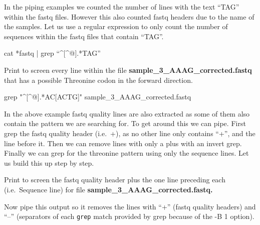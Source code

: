 \documentclass[
  letterpaper,
  DIV=11,
  numbers=noendperiod]{scrreprt}
\newenvironment{Shaded}{\begin{snugshade}}{\end{snugshade}}
\newcommand{\AttributeTok}[1]{\textcolor[rgb]{0.40,0.45,0.13}{#1}}
\newcommand{\FunctionTok}[1]{\textcolor[rgb]{0.28,0.35,0.67}{#1}}
\newcommand{\KeywordTok}[1]{\textcolor[rgb]{0.00,0.23,0.31}{#1}}
\newcommand{\NormalTok}[1]{\textcolor[rgb]{0.00,0.23,0.31}{#1}}
\newcommand{\PreprocessorTok}[1]{\textcolor[rgb]{0.68,0.00,0.00}{#1}}
\newcommand{\SpecialStringTok}[1]{\textcolor[rgb]{0.13,0.47,0.30}{#1}}
\newcommand{\StringTok}[1]{\textcolor[rgb]{0.13,0.47,0.30}{#1}}
\begin{document}
In the piping examples we counted the number of lines with the text
``TAG'' within the fastq files. However this also counted fastq headers
due to the name of the samples. Let us use a regular expression to only
count the number of sequences within the fastq files that contain
``TAG''.

\begin{Shaded}
\begin{Highlighting}[]
\FunctionTok{cat} \PreprocessorTok{*}\NormalTok{fastq }\KeywordTok{|} \FunctionTok{grep}\NormalTok{ “\^{}}\PreprocessorTok{[\^{}}\SpecialStringTok{@}\PreprocessorTok{]}\NormalTok{.}\PreprocessorTok{*}\NormalTok{TAG”}
\end{Highlighting}
\end{Shaded}

Print to screen every line within the file
\textbf{sample\_3\_AAAG\_corrected.fastq} that has a possible Threonine
codon in the forward direction.

\begin{Shaded}
\begin{Highlighting}[]
\FunctionTok{grep} \StringTok{"\^{}[\^{}@].*AC[ACTG]"}\NormalTok{ sample\_3\_AAAG\_corrected.fastq}
\end{Highlighting}
\end{Shaded}

In the above example fastq quality lines are also extracted as some of
them also contain the pattern we are searching for. To get around this
we can pipe. First grep the fastq quality header (i.e.~+), as no other
line only contains ``+'', and the line before it. Then we can remove
lines with only a plus with an invert grep. Finally we can grep for the
threonine pattern using only the sequence lines. Let us build this up
step by step.

Print to screen the fastq quality header plus the one line preceding
each (i.e.~Sequence line) for file
\textbf{sample\_3\_AAAG\_corrected.fastq.}

\begin{Shaded}
\end{Shaded}

Now pipe this output so it removes the lines with ``+'' (fastq quality
headers) and ``--'' (separators of each \texttt{grep} match provided by
grep because of the -B 1 option).
\end{document}
